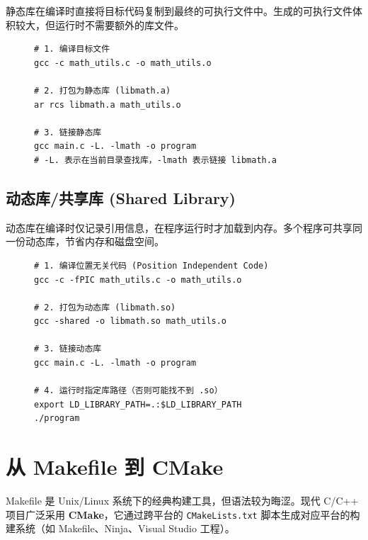 静态库在编译时直接将目标代码复制到最终的可执行文件中。生成的可执行文件体积较大，但运行时不需要额外的库文件。

\begin{figure}[H]
\centering
\begin{minipage}{0.95\textwidth}
\begin{lstlisting}[caption={静态库制作与使用 (Linux)}]
# 1. 编译目标文件
gcc -c math_utils.c -o math_utils.o

# 2. 打包为静态库 (libmath.a)
ar rcs libmath.a math_utils.o

# 3. 链接静态库
gcc main.c -L. -lmath -o program
# -L. 表示在当前目录查找库，-lmath 表示链接 libmath.a
\end{lstlisting}
\end{minipage}
\end{figure}

\subsection{动态库/共享库 (Shared Library)}

动态库在编译时仅记录引用信息，在程序运行时才加载到内存。多个程序可共享同一份动态库，节省内存和磁盘空间。

\begin{figure}[H]
\centering
\begin{minipage}{0.95\textwidth}
\begin{lstlisting}[caption={动态库制作与使用 (Linux)}]
# 1. 编译位置无关代码 (Position Independent Code)
gcc -c -fPIC math_utils.c -o math_utils.o

# 2. 打包为动态库 (libmath.so)
gcc -shared -o libmath.so math_utils.o

# 3. 链接动态库
gcc main.c -L. -lmath -o program

# 4. 运行时指定库路径（否则可能找不到 .so）
export LD_LIBRARY_PATH=.:$LD_LIBRARY_PATH
./program
\end{lstlisting}
\end{minipage}
\end{figure}

\section{从 Makefile 到 CMake}

Makefile 是 Unix/Linux 系统下的经典构建工具，但语法较为晦涩。现代 C/C++ 项目广泛采用 \textbf{CMake}，它通过跨平台的 \texttt{CMakeLists.txt} 脚本生成对应平台的构建系统（如 Makefile、Ninja、Visual Studio 工程）。

